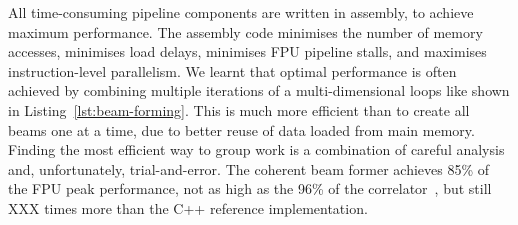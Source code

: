 \documentclass{llncs}
\begin{document}
All time-consuming pipeline components are written in assembly, to achieve maximum performance.  The assembly code minimises the number of memory accesses, minimises load delays, minimises FPU pipeline stalls, and maximises instruction-level parallelism.  We learnt that optimal performance is often achieved by combining multiple iterations of a multi-dimensional loops like shown in Listing~\ref{lst:beam-forming}. This is much more efficient than to create all beams one at a time, due to better reuse of data loaded from main memory.  Finding the most efficient way to group work is a combination of careful analysis and, unfortunately, trial-and-error. The coherent beam former achieves 85\% of the FPU peak performance, not as high as the 96\% of the correlator~\cite{Romein:10a}, but still XXX times more than the C++ reference implementation. 


\end{document}
